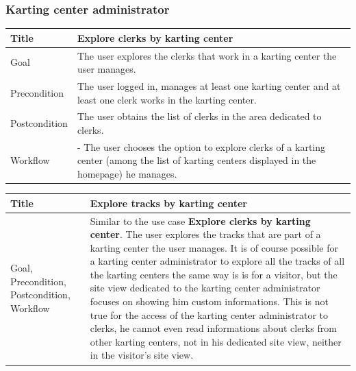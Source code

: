 \documentclass{beamer}
\begin{document}
\begin{frame}
    \frametitle{Karting center administrator}
    \begin{table}
        \tiny
        \begin{tabular}{|p{2cm}|p{6cm}|}
        \hline  
        Title & \textbf{Explore clerks by karting center} \\
        \hline
        Goal & The user explores the clerks that work in a karting center the user manages. \\
        \hline
        Precondition & The user logged in, manages at least one karting center and at least one clerk
        works in the karting center.\\
        \hline
        Postcondition & The user obtains the list of clerks in the area dedicated to clerks. \\
        \hline
        Workflow &
        - The user chooses the option to explore clerks of a karting center 
        (among the list of karting centers displayed in the homepage) he manages. \\
        \hline
        \end{tabular}
\end{table}

\begin{table}
    \tiny
    \begin{tabular}{|p{2cm}|p{6cm}|}
    \hline  
    Title & \textbf{Explore tracks by karting center} \\
    \hline
    Goal, Precondition, Postcondition, Workflow & Similar to the use case \textbf{Explore clerks by karting center}.
    The user explores the tracks that are part of a karting center the user manages. It is of course
    possible for a karting center administrator to explore all the tracks of all the karting centers
    the same way is is for a visitor, but the site view dedicated to the karting center administrator
    focuses on showing him custom informations. This is not true for the access of the karting center administrator 
    to clerks, he cannot even read informations about clerks from other karting centers, not in his dedicated 
    site view, neither in the visitor's site view.\\
    \hline
    \end{tabular}
\end{table}
\end{frame}
\end{document}
